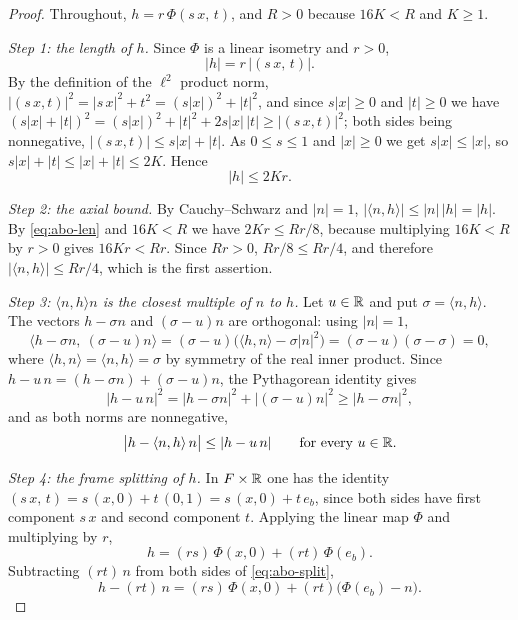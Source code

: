 \begin{proof}
Throughout, $h=r\,\Phi(s\,x,\,t)$, and $R>0$ because $16K<R$ and $K\ge1$.

\emph{Step 1: the length of $h$.}
Since $\Phi$ is a linear isometry and $r>0$,
\[
  |h|=r\,\bigl|(s\,x,\,t)\bigr| .
\]
By the definition of the $\ell^2$ product norm,
$|(s\,x,t)|^2=|s\,x|^2+t^2=(s|x|)^2+|t|^2$, and since $s|x|\ge0$ and $|t|\ge0$ we have
$(s|x|+|t|)^2=(s|x|)^2+|t|^2+2s|x|\,|t|\ge|(s\,x,t)|^2$; both sides being nonnegative,
$|(s\,x,t)|\le s|x|+|t|$. As $0\le s\le1$ and $|x|\ge0$ we get $s|x|\le|x|$, so
$s|x|+|t|\le|x|+|t|\le2K$. Hence
\begin{equation}\label{eq:abo-len}
  |h|\le2Kr .
\end{equation}

\emph{Step 2: the axial bound.}
By Cauchy--Schwarz and $|n|=1$, $|\langle n,h\rangle|\le|n|\,|h|=|h|$. By
\eqref{eq:abo-len} and $16K<R$ we have $2Kr\le Rr/8$, because multiplying $16K<R$ by
$r>0$ gives $16Kr<Rr$. Since $Rr>0$, $Rr/8\le Rr/4$, and therefore
$|\langle n,h\rangle|\le Rr/4$, which is the first assertion.

\emph{Step 3: $\langle n,h\rangle n$ is the closest multiple of $n$ to $h$.}
Let $u\in\mathbb{R}$ and put $\sigma=\langle n,h\rangle$. The vectors $h-\sigma n$ and
$(\sigma-u)n$ are orthogonal: using $|n|=1$,
\[
  \langle h-\sigma n,\ (\sigma-u)n\rangle
   =(\sigma-u)\bigl(\langle h,n\rangle-\sigma|n|^2\bigr)
   =(\sigma-u)(\sigma-\sigma)=0 ,
\]
where $\langle h,n\rangle=\langle n,h\rangle=\sigma$ by symmetry of the real inner
product. Since $h-u\,n=(h-\sigma n)+(\sigma-u)n$, the Pythagorean identity gives
\[
  |h-u\,n|^2=|h-\sigma n|^2+|(\sigma-u)n|^2\ge|h-\sigma n|^2 ,
\]
and as both norms are nonnegative,
\begin{equation}\label{eq:abo-proj}
  \bigl|h-\langle n,h\rangle\,n\bigr|\le|h-u\,n|
  \qquad\text{for every }u\in\mathbb{R} .
\end{equation}

\emph{Step 4: the frame splitting of $h$.}
In $F\times\mathbb{R}$ one has the identity $(s\,x,\,t)=s\,(x,0)+t\,(0,1)=s\,(x,0)+t\,e_b$,
since both sides have first component $s\,x$ and second component $t$. Applying the
linear map $\Phi$ and multiplying by $r$,
\begin{equation}\label{eq:abo-split}
  h=(rs)\,\Phi(x,0)+(rt)\,\Phi(e_b) .
\end{equation}
Subtracting $(rt)\,n$ from both sides of \eqref{eq:abo-split},
\begin{equation}\label{eq:abo-shift}
  h-(rt)\,n=(rs)\,\Phi(x,0)+(rt)\bigl(\Phi(e_b)-n\bigr).
\end{equation}


\end{proof}

